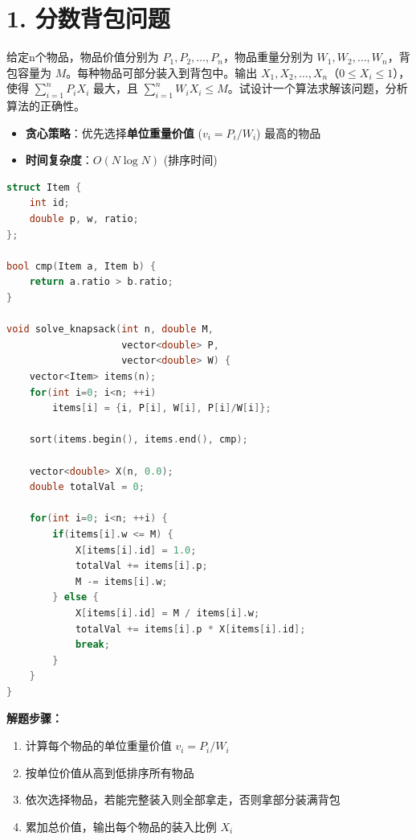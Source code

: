 \section*{1. 分数背包问题}

给定n个物品，物品价值分别为 $P_1, P_2, \ldots, P_n$，物品重量分别为 $W_1, W_2, \ldots, W_n$，背包容量为 $M$。每种物品可部分装入到背包中。输出 $X_1, X_2, \ldots, X_n$（$0 \le X_i \le 1$），使得 $\sum_{i=1}^{n} P_i X_i$ 最大，且 $\sum_{i=1}^{n} W_i X_i \le M$。试设计一个算法求解该问题，分析算法的正确性。

\begin{itemize}
    \item \textbf{贪心策略}：优先选择\textbf{单位重量价值} ($v_i = P_i / W_i$) 最高的物品
    \item \textbf{时间复杂度}：$O(N \log N)$ (排序时间)
\end{itemize}

\begin{lstlisting}[language=C++, style=cppstyle]
struct Item {
    int id;
    double p, w, ratio;
};

bool cmp(Item a, Item b) {
    return a.ratio > b.ratio;
}

void solve_knapsack(int n, double M,
                    vector<double> P,
                    vector<double> W) {
    vector<Item> items(n);
    for(int i=0; i<n; ++i)
        items[i] = {i, P[i], W[i], P[i]/W[i]};

    sort(items.begin(), items.end(), cmp);

    vector<double> X(n, 0.0);
    double totalVal = 0;

    for(int i=0; i<n; ++i) {
        if(items[i].w <= M) {
            X[items[i].id] = 1.0;
            totalVal += items[i].p;
            M -= items[i].w;
        } else {
            X[items[i].id] = M / items[i].w;
            totalVal += items[i].p * X[items[i].id];
            break;
        }
    }
}
\end{lstlisting}

\textbf{解题步骤：}
\begin{enumerate}
    \item 计算每个物品的单位重量价值 $v_i = P_i / W_i$
    \item 按单位价值从高到低排序所有物品
    \item 依次选择物品，若能完整装入则全部拿走，否则拿部分装满背包
    \item 累加总价值，输出每个物品的装入比例 $X_i$
\end{enumerate}

